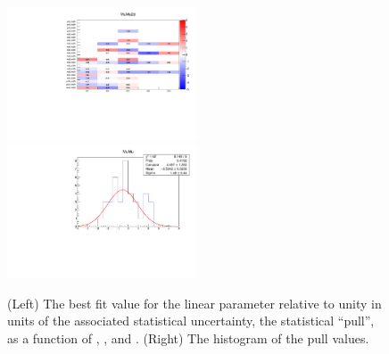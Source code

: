 \begin{figure}[h!]
  \centering
  \includegraphics[width=0.5\textwidth]{figures/mhtTemplate/exclusive/MuMu_2D}~
  \includegraphics[width=0.5\textwidth]{figures/mhtTemplate/exclusive/MuMu}\\
  \caption{(Left) The best fit value for the linear parameter
    relative to unity in units of the associated statistical
    uncertainty, \ie the statistical ``pull'', as a function of \njet,
    \nb, and \scalht. (Right) The histogram of the pull values.}
  \label{fig:pulls-zinv} 
\end{figure}

